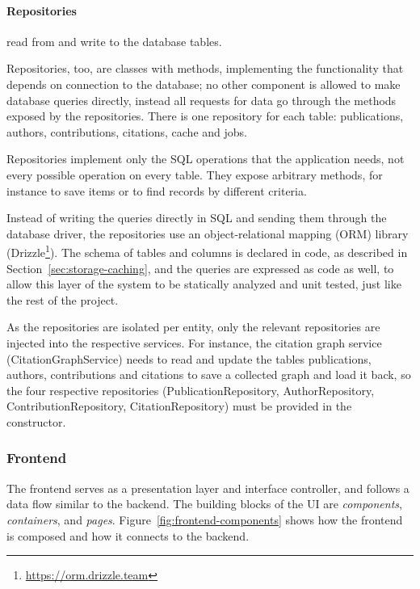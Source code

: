 \paragraph{Repositories} read from and write to the database tables.

Repositories, too, are classes with methods, implementing the functionality that depends on connection to the database; no other component is allowed to make database queries directly, instead all requests for data go through the methods exposed by the repositories.
There is one repository for each table: \textsf{publications}, \textsf{authors}, \textsf{contributions}, \textsf{citations}, \textsf{cache} and \textsf{jobs}.

Repositories implement only the SQL operations that the application needs, not every possible operation on every table.
They expose arbitrary methods, for instance to save items or to find records by different criteria.

Instead of writing the queries directly in SQL and sending them through the database driver, the repositories use an object-relational mapping (ORM) library (\textsf{Drizzle}\footnote{\url{https://orm.drizzle.team}}).
The schema of tables and columns is declared in code, as described in Section~\ref{sec:storage-caching}, and the queries are expressed as code as well, to allow this layer of the system to be statically analyzed and unit tested, just like the rest of the project.

As the repositories are isolated per entity, only the relevant repositories are injected into the respective services.
For instance, the citation graph service (\textsf{CitationGraphService}) needs to read and update the tables \textsf{publications}, \textsf{authors}, \textsf{contributions} and \textsf{citations} to save a collected graph and load it back, so the four respective repositories (\textsf{PublicationRepository}, \textsf{AuthorRepository}, \textsf{ContributionRepository}, \textsf{CitationRepository}) must be provided in the constructor.

\subsubsection{Frontend} \label{sec:frontend-layers}

The frontend serves as a presentation layer and interface controller, and follows a data flow similar to the backend.
The building blocks of the UI are \emph{components}, \emph{containers}, and \emph{pages}.
Figure~\ref{fig:frontend-components} shows how the frontend is composed and how it connects to the backend. 

